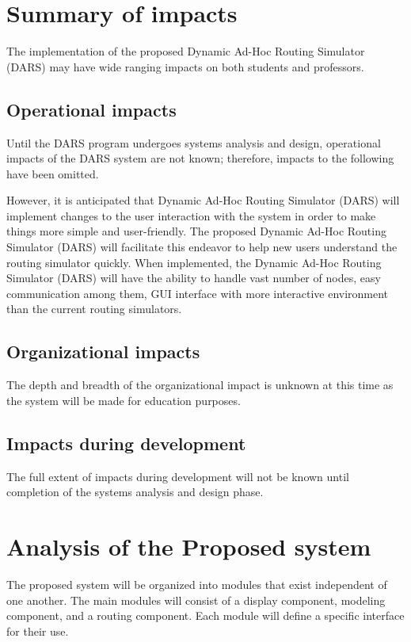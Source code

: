 \documentclass[a4paper,11pt,titlepage]{article}
\begin{document}
\section{Summary of impacts}
The implementation of the proposed Dynamic Ad-Hoc Routing Simulator (DARS) may have wide ranging impacts on both students and professors.
 
\subsection{Operational impacts}
Until the DARS program undergoes systems analysis and design, operational impacts of the DARS system are not known; therefore, impacts to the following have been omitted.
 
However, it is anticipated that Dynamic Ad-Hoc Routing Simulator (DARS) will implement changes to the user interaction with the system in order to make things more simple and user-friendly.  The proposed Dynamic Ad-Hoc Routing Simulator (DARS) will facilitate this endeavor to help new users understand the routing simulator quickly.  When implemented, the Dynamic Ad-Hoc Routing Simulator (DARS) will have the ability to handle vast number of nodes, easy communication among them, GUI interface with more interactive environment than the current routing simulators.
 
\subsection{Organizational impacts}
The depth and breadth of the organizational impact is unknown at this time as the system will be made for education purposes.
 
\subsection{Impacts during development}
The full extent of impacts during development will not be known until completion of the systems analysis and design phase. 
 
\section{Analysis of the Proposed system}
The proposed system will be organized into modules that exist independent of one another. The main modules will consist of a display component, modeling component, and a routing component. Each module will define a specific interface for their use. 
 
\end{document}
